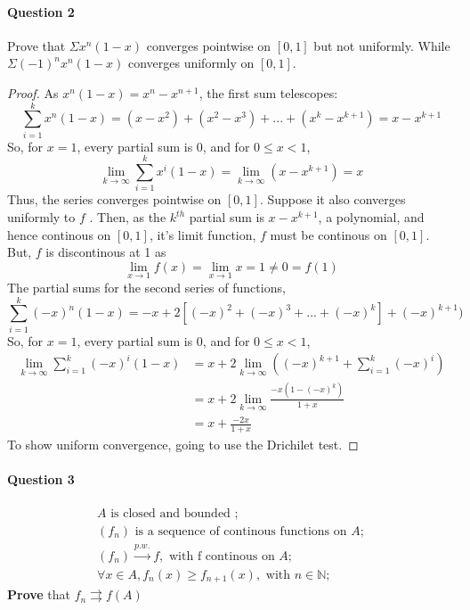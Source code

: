 \documentclass[20pt,a4paper]{extarticle} %
\begin{document}
\paragraph{Question 2}
Prove that $\Sigma x^n(1-x)$ converges pointwise on $[0,1]$ but not uniformly.
While $\Sigma (-1)^nx^n(1-x) $ converges uniformly on $[0,1]$.
\begin{proof}
	As $x^n(1-x) = x^n - x^{n+1}$, the first sum telescopes:
	\[\sum_{i=1}^k x^n(1-x) = (x - x^2) + (x^2 -x^3) +... + (x^k -x^{k+1}) = x- x^{k+1} \]
	So, for $x=1$, every partial sum is 0, and for $0\leq x <1$,
	\[ \lim_{k \to \infty } \sum_{i=1}^k x^i(1-x) = \lim_{k \to \infty }(x - x^{k+1})=x\]
	Thus, the series converges pointwise on $[0,1]$. Suppose it also converges uniformly to $f$ .
	Then, as the $k^{th}$ partial sum is $x-x^{k+1}$, a polynomial, and hence continous on $[0,1]$,
	it's limit function, $f$ must be continous on $[0,1]$. But, $f$ is discontinous at 1 as
	\[ \lim_{x \to 1} f(x) = \lim_{x \to 1} x = 1 \neq 0 = f(1) \]
	\pagebreak
	The partial sums for the second series of functions,
	\[\sum_{i=1}^k (-x)^n(1-x) = -x +2[(-x)^2 + (-x)^3 + ... + (-x)^k] + (-x)^{k+1})\]
	So, for $x=1$, every partial sum is 0, and for $0\leq x <1$,
	\begin{align*}
		\lim_{k \to \infty } \sum_{i=1}^k (-x)^i(1-x) &= x + 2\lim_{k \to \infty }((-x)^{k+1}+\sum_{i=1}^k (-x)^i ) \\
							      &=x + 2 \lim_{k \to \infty }\frac{-x(1-(-x)^k)}{1+x}\\
							      &=x+\frac{-2x}{1+x}
	\end{align*}
	To show uniform convergence, going to use the Drichilet test.

\end{proof}

\pagebreak

\paragraph{Question 3}
\begin{eqnarray*}
	A \text{ is closed and bounded }; \\
	(f_n) \text{ is a sequence of continous functions on }A; \\
	(f_n) \xrightarrow{p.w.} f, \text{ with f continous on }A; \\
	\forall x \in A, f_n(x) \geq f_{n+1}(x), \text{ with } n \in \mathbb{N};
\end{eqnarray*}
\textbf{Prove} that $f_n \rightrightarrows f(A)$ \\
\end{document}
